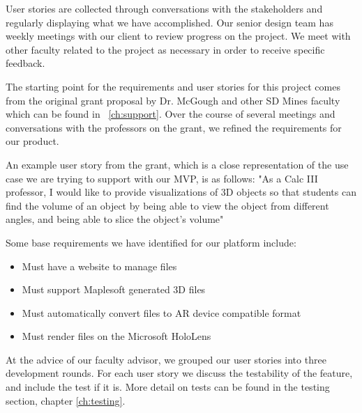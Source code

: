 User stories are collected through conversations with the stakeholders and
regularly displaying what we have accomplished. Our senior design team has
weekly meetings with our client to review progress on the project. We meet
with other faculty related to the project as necessary in order to receive
specific feedback.

The starting point for the requirements and user stories for this project comes
from the original grant proposal by Dr. McGough and other SD Mines faculty
which can be found in ~\autoref{ch:support}. Over the course of several
meetings and conversations with the professors on the grant, we refined the
requirements for our product.

An example user story from the grant, which is a close representation of the
use case we are trying to support with our MVP, is as follows: "As a Calc III
professor, I would like to provide visualizations of 3D objects so that
students can find the volume of an object by being able to view the object
from different angles, and being able to slice the object's volume"

Some base requirements we have identified for our platform include:
\begin{itemize}
	\item Must have a website to manage files
	\item Must support Maplesoft generated 3D files
	\item Must automatically convert files to AR device compatible format
	\item Must render files on the Microsoft HoloLens
\end{itemize}

At the advice of our faculty advisor, we grouped our user stories into three 
development rounds. For each user story we discuss the testability of the 
feature, and include the test if it is. More detail on tests can be found in the testing section, chapter \ref{ch:testing}.



